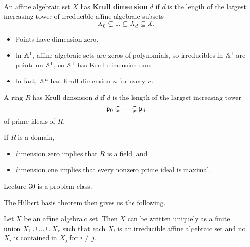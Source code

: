 \pagebreak

\begin{definition}
An affine algebraic set $ X $ has \textbf{Krull dimension} $ d $ if $ d $ is the length of the largest increasing tower of irreducible affine algebraic subsets
$$ X_0 \subsetneq \dots \subsetneq X_d \subseteq X. $$
\end{definition}

\begin{example*}
\hfill
\begin{itemize}
\item Points have dimension zero.
\item In $ \mathbb{A}^1 $, affine algebraic sets are zeros of polynomials, so irreducibles in $ \mathbb{A}^1 $ are points on $ \mathbb{A}^1 $, so $ \mathbb{A}^1 $ has Krull dimension one.
\item In fact, $ \mathbb{A}^n $ has Krull dimension $ n $ for every $ n $.
\end{itemize}
\end{example*}

\begin{definition}
A ring $ R $ has Krull dimension $ d $ if $ d $ is the length of the largest increasing tower
$$ \mathfrak{p}_0 \subsetneq \dots \subsetneq \mathfrak{p}_d $$
of prime ideals of $ R $.
\end{definition}

\begin{example*}
If $ R $ is a domain,
\begin{itemize}
\item dimension zero implies that $ R $ is a field, and
\item dimension one implies that every nonzero prime ideal is maximal.
\end{itemize}
\end{example*}


Lecture 30 is a problem class.

The Hilbert basis theorem then gives us the following.

\begin{proposition}
Let $ X $ be an affine algebraic set. Then $ X $ can be written uniquely as a finite union $ X_1 \cup \dots \cup X_r $ such that each $ X_i $ is an irreducible affine algebraic set and no $ X_i $ is contained in $ X_j $ for $ i \ne j $.
\end{proposition}

